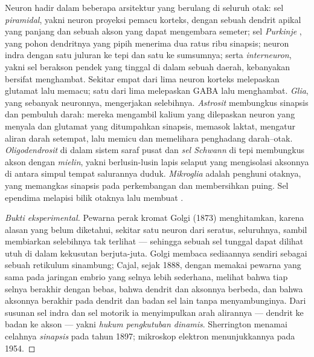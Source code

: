 \begin{definition}\label{def:b3:nervous-systems:cells}
%
Neuron hadir dalam beberapa arsitektur yang berulang di seluruh otak:
sel \emph{piramidal}, yakni neuron proyeksi pemacu korteks,
dengan sebuah dendrit apikal yang panjang dan sebuah akson yang dapat mengembara
semeter; sel \emph{Purkinje} , yang pohon dendritnya
yang pipih menerima dua ratus ribu sinapsis; neuron indra dengan satu
juluran ke tepi dan satu ke sumsumnya; serta \emph{interneuron},
yakni sel berakson pendek yang tinggal di dalam sebuah daerah, kebanyakan bersifat
menghambat. Sekitar empat dari lima neuron korteks melepaskan glutamat lalu
memacu; satu dari lima melepaskan GABA lalu menghambat. \emph{Glia}, yang
sebanyak neuronnya, mengerjakan selebihnya. \emph{Astrosit} membungkus sinapsis
dan pembuluh darah: mereka mengambil kalium yang dilepaskan neuron yang menyala
dan glutamat yang ditumpahkan sinapsis, memasok laktat, mengatur aliran darah
setempat, lalu memicu dan memelihara penghadang darah--otak.
\emph{Oligodendrosit} di dalam sistem saraf pusat dan \emph{sel Schwann}
di tepi membungkus akson dengan \emph{mielin}, yakni berlusin-lusin lapis
selaput yang mengisolasi aksonnya di antara simpul tempat salurannya
duduk. \emph{Mikroglia} adalah  penghuni otaknya, yang memangkas
sinapsis pada perkembangan dan membersihkan puing. Sel ependima melapisi
bilik otaknya lalu membuat .
\end{definition}

\begin{proof}[Bukti eksperimental]
Pewarna perak kromat Golgi (1873) menghitamkan, karena alasan yang belum
diketahui, sekitar satu neuron dari seratus, seluruhnya, sambil membiarkan
selebihnya tak terlihat --- sehingga sebuah sel tunggal dapat dilihat utuh di
dalam kekusutan berjuta-juta. Golgi membaca sediaannya sendiri sebagai sebuah
retikulum sinambung; Cajal, sejak 1888, dengan memakai pewarna yang sama pada
jaringan embrio yang selnya lebih sederhana, melihat bahwa tiap selnya berakhir
dengan bebas, bahwa dendrit dan aksonnya berbeda, dan bahwa aksonnya berakhir
pada dendrit dan badan sel lain tanpa menyambunginya. Dari susunan sel indra dan
sel motorik ia menyimpulkan arah alirannya --- dendrit ke badan ke akson ---
yakni \emph{hukum pengkutuban dinamis}. Sherrington menamai celahnya
\emph{sinapsis} pada tahun 1897; mikroskop elektron menunjukkannya pada 1954.
\end{proof}

